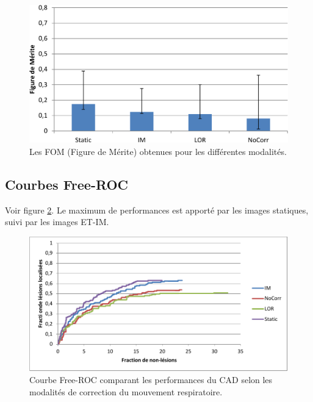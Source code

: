 \begin{figure}[h!]
 \begin{center}
   \includegraphics[width=15cm]{images/FOM_mod}
 \end{center}
 \caption{ \label{lab:fom_mod19} Les FOM (Figure de Mérite) obtenues pour les différentes modalités.}
\end{figure}

\subsection{Courbes Free-ROC}

Voir figure \ref{lab:froc_mod}.
Le maximum de performances est apporté par les images statiques, suivi par les images ET-IM.

\begin{figure}[h!]
 \begin{center}
   \includegraphics[width=15cm]{images/FROC_mod}
 \end{center}
 \caption{ \label{lab:froc_mod} Courbe Free-ROC comparant les performances du CAD selon les modalités de correction du mouvement respiratoire.}
\end{figure}


